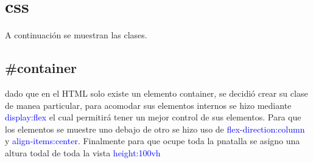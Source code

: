 \documentclass[12pt]{article}
\begin{document}
\section{css}

A continuación se muestran las clases.

\subsection{\#container}

dado que en el HTML solo existe un elemento container, se decidió crear su clase de manea particular, para acomodar sus elementos internos se hizo mediante \textcolor{blue}{display:flex} el cual permitirá tener un mejor control de sus elementos. Para que los elementos se muestre uno debajo de otro se hizo uso de \textcolor{blue}{flex-direction:column} y \textcolor{blue}{align-items:center}.
Finalmente para que ocupe toda la pnatalla se asigno una altura todal de toda la vista \textcolor{blue}{height:100vh}
\end{document}
